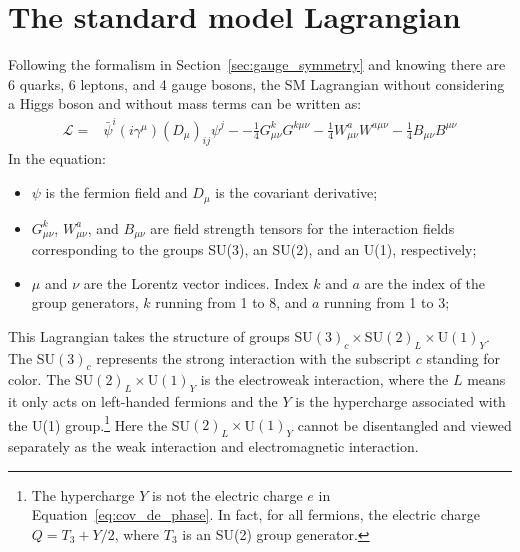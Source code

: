 \section{The standard model Lagrangian}\label{sec:SM_Lagrangian}

Following the formalism in Section~\ref{sec:gauge_symmetry} and knowing there are 6 quarks, 6 leptons, and 4 gauge bosons,
the SM Lagrangian without considering a Higgs boson and without mass terms can be written as:
\begin{equation}\label{eq:SM_Lagrangian}
  \begin{split}
    \mathcal{L} = & \bar{\psi}^{i} (i\gamma^{\mu})(D_{\mu})_{ij}\psi^{j} -
                  - \frac{1}{4} G^{k}_{\mu\nu}G^{k\mu\nu}
                  - \frac{1}{4} W^{a}_{\mu\nu}W^{a\mu\nu}
                  - \frac{1}{4} B_{\mu\nu}B^{\mu\nu}
  \end{split}
\end{equation}
In the equation:
\begin{itemize}
  \item $\psi$ is the fermion field and $D_{\mu}$ is the covariant derivative;
  \item $G^{k}_{\mu\nu}$, $W^{a}_{\mu\nu}$, and $B_{\mu\nu}$ are field strength tensors for the interaction fields 
        corresponding to the groups SU(3), an SU(2), and an U(1), respectively;
  \item $\mu$ and $\nu$ are the Lorentz vector indices. Index $k$ and $a$ are the index of the group generators, $k$ running from 1 to 8, and $a$ running from 1 to 3;
\end{itemize}


This Lagrangian takes the structure of groups SU$(3)_{c} \times$SU$(2)_{L} \times$U$(1)_{Y}$.
The SU$(3)_{c}$ represents the strong interaction with the subscript $c$ standing for color.
The SU$(2)_{L} \times$U$(1)_{Y}$ is the electroweak interaction, 
where the $L$ means it only acts on left-handed fermions
and the $Y$ is the hypercharge associated with the U(1) group.\footnote{The hypercharge $Y$ is not the electric charge $e$ in Equation~\ref{eq:cov_de_phase}.
In fact, for all fermions, the electric charge $Q = T_{3} + Y/2$, where $T_{3}$ is an SU(2) group generator.}
Here the SU$(2)_{L} \times$U$(1)_{Y}$ cannot be disentangled and viewed separately as the weak interaction and electromagnetic interaction.

